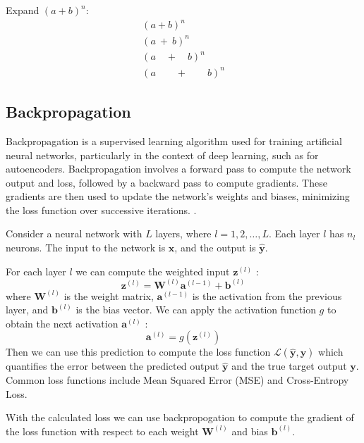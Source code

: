 Expand $(a+b)^n$:
\begin{gather*}
  (a + b)^n\\
  (a\ + \ b)^n\\
  (a\quad + \quad b)^n\\
  (a\qquad + \qquad b)^n
\end{gather*}

\subsection{Backpropagation}
Backpropagation is a supervised learning algorithm used for training artificial neural networks, particularly in the context of deep learning, such as for autoencoders. Backpropagation involves a forward pass to compute the network output and loss, followed by a backward pass to compute gradients. These gradients are then used to update the network's weights and biases, minimizing the loss function over successive iterations. \cite{backprop}. 

Consider a neural network with $L$ layers, where $l=1,2, \ldots, L$. Each layer $l$ has $n_l$ neurons. The input to the network is $\mathbf{x}$, and the output is $\hat{\mathbf{y}}$.

For each layer $l$ we can compute the weighted input $\mathbf{z}^{(l)}$ :
$$
\mathbf{z}^{(l)}=\mathbf{W}^{(l)} \mathbf{a}^{(l-1)}+\mathbf{b}^{(l)}
$$
where $\mathbf{W}^{(l)}$ is the weight matrix, $\mathbf{a}^{(l-1)}$ is the activation from the previous layer, and $\mathbf{b}^{(l)}$ is the bias vector. We can apply the activation function $g$ to obtain the next activation $\mathbf{a}^{(l)}$ :
$$
\mathbf{a}^{(l)}=g\left(\mathbf{z}^{(l)}\right)
$$
Then we can use this prediction to compute the loss function $\mathcal{L}(\hat{\mathbf{y}}, \mathbf{y})$ which quantifies the error between the predicted output $\hat{\mathbf{y}}$ and the true target output $\mathbf{y}$. Common loss functions include Mean Squared Error (MSE) and Cross-Entropy Loss. 

With the calculated loss we can use backpropogation to compute the gradient of the loss function with respect to each weight $\mathbf{W}^{(l)}$ and bias $\mathbf{b}^{(l)}$. 

